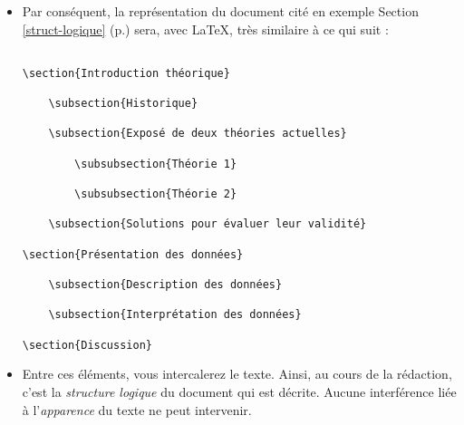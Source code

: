 \begin{itemize}
\item Par conséquent, la représentation du document cité en exemple
  Section \ref{struct-logique} (p.\pageref{struct-logique}) sera, avec
  \LaTeX, très similaire à ce qui suit :
    \begin{exemple}
      \caption{Comment \LaTeX\ incite à se focaliser sur le contenu
        plutôt que sur la forme.}
      \footnotesize
\begin{verbatim}

\section{Introduction théorique}

    \subsection{Historique}

    \subsection{Exposé de deux théories actuelles}

        \subsubsection{Théorie 1}

        \subsubsection{Théorie 2}

    \subsection{Solutions pour évaluer leur validité}

\section{Présentation des données}

    \subsection{Description des données}

    \subsection{Interprétation des données}

\section{Discussion}
\end{verbatim}
    \end{exemple}
  \item Entre ces éléments, vous intercalerez le texte. Ainsi, au
    cours de la rédaction, c'est la \emph{structure logique} du
    document qui est décrite.  Aucune interférence liée à
    l'\emph{apparence} du texte ne peut intervenir.
\end{itemize}


